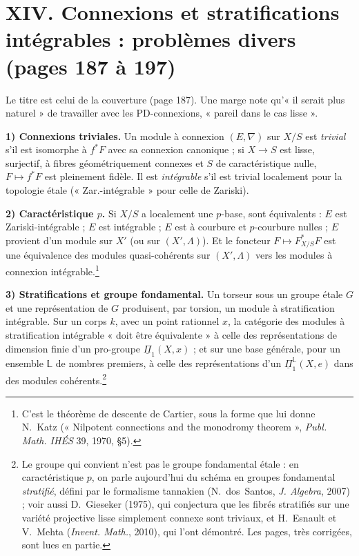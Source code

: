 \documentclass[11pt,a4paper]{article}
\begin{document}
\section*{XIV. Connexions et stratifications intégrables : problèmes divers (pages 187 à 197)}

Le titre est celui de la couverture (page 187). Une marge note qu'« il serait
plus naturel » de travailler avec les PD-connexions, « pareil dans le cas
lisse ».

\textbf{1) Connexions triviales.} Un module à connexion $(E, \nabla)$ sur $X/S$
est \emph{trivial} s'il est isomorphe à $f^*F$ avec sa connexion canonique ;
si $X \to S$ est lisse, surjectif, à fibres géométriquement connexes et $S$ de
caractéristique nulle, $F \mapsto f^*F$ est pleinement fidèle. Il est
\emph{intégrable} s'il est trivial localement pour la topologie étale
(« Zar.-intégrable » pour celle de Zariski).

\textbf{2) Caractéristique $p$.} Si $X/S$ a localement une $p$-base, sont
équivalents : $E$ est Zariski-intégrable ; $E$ est intégrable ; $E$ est à
courbure et $p$-courbure nulles ; $E$ provient d'un module sur $X'$ (ou sur
$(X', \Lambda)$). Et le foncteur $F \mapsto F^*_{X/S}F$ est une équivalence des
modules quasi-cohérents sur $(X', \Lambda)$ vers les modules à connexion
intégrable.\footnote{C'est le théorème de descente de Cartier, sous la forme
que lui donne N.~Katz (« Nilpotent connections and the monodromy
theorem », \emph{Publ. Math. IHÉS} 39, 1970, §5).}

\textbf{3) Stratifications et groupe fondamental.} Un torseur sous un groupe
étale $G$ et une représentation de $G$ produisent, par torsion, un module à
stratification intégrable. Sur un corps $k$, avec un point rationnel $x$, la
catégorie des modules à stratification intégrable « doit être équivalente »
à celle des représentations de dimension finie d'un pro-groupe
$\underline{\Pi}_1(X,x)$ ; et sur une base générale, pour un ensemble
$\mathbb{L}$ de nombres premiers, à celle des représentations d'un
$\underline{\Pi}_1^{\mathbb{L}}(X,e)$ dans des modules cohérents.\footnote{Le
groupe qui convient n'est pas le groupe fondamental étale : en
caractéristique $p$, on parle aujourd'hui du schéma en groupes fondamental
\emph{stratifié}, défini par le formalisme tannakien (N.~dos~Santos,
\emph{J. Algebra}, 2007) ; voir aussi D.~Gieseker (1975), qui conjectura que
les fibrés stratifiés sur une variété projective lisse simplement connexe
sont triviaux, et H.~Esnault et V.~Mehta (\emph{Invent. Math.}, 2010), qui
l'ont démontré. Les pages, très corrigées, sont lues en partie.}
\end{document}
